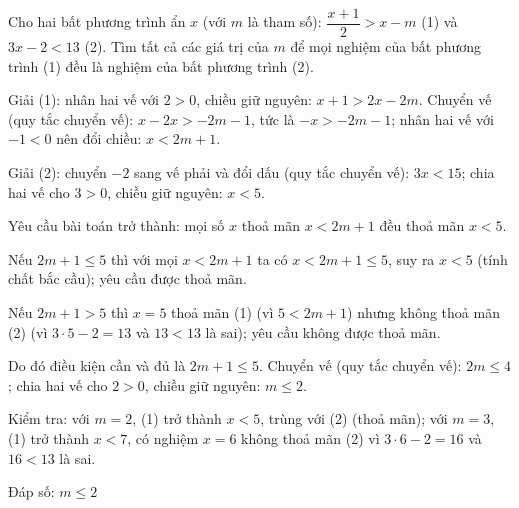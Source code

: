 \begin{problem}[9DS-BPT-030]
Cho hai bất phương trình ẩn $x$ (với $m$ là tham số): $\dfrac{x + 1}{2} > x - m$ (1) và $3x - 2 < 13$ (2). Tìm tất cả các giá trị của $m$ để mọi nghiệm của bất phương trình (1) đều là nghiệm của bất phương trình (2).

\begin{solution}
Giải (1): nhân hai vế với $2 > 0$, chiều giữ nguyên: $x + 1 > 2x - 2m$. Chuyển vế (quy tắc chuyển vế): $x - 2x > -2m - 1$, tức là $-x > -2m - 1$; nhân hai vế với $-1 < 0$ nên đổi chiều: $x < 2m + 1$.

Giải (2): chuyển $-2$ sang vế phải và đổi dấu (quy tắc chuyển vế): $3x < 15$; chia hai vế cho $3 > 0$, chiều giữ nguyên: $x < 5$.

Yêu cầu bài toán trở thành: mọi số $x$ thoả mãn $x < 2m + 1$ đều thoả mãn $x < 5$.

Nếu $2m + 1 \leq 5$ thì với mọi $x < 2m + 1$ ta có $x < 2m + 1 \leq 5$, suy ra $x < 5$ (tính chất bắc cầu); yêu cầu được thoả mãn.

Nếu $2m + 1 > 5$ thì $x = 5$ thoả mãn (1) (vì $5 < 2m + 1$) nhưng không thoả mãn (2) (vì $3 \cdot 5 - 2 = 13$ và $13 < 13$ là sai); yêu cầu không được thoả mãn.

Do đó điều kiện cần và đủ là $2m + 1 \leq 5$. Chuyển vế (quy tắc chuyển vế): $2m \leq 4$; chia hai vế cho $2 > 0$, chiều giữ nguyên: $m \leq 2$.

Kiểm tra: với $m = 2$, (1) trở thành $x < 5$, trùng với (2) (thoả mãn); với $m = 3$, (1) trở thành $x < 7$, có nghiệm $x = 6$ không thoả mãn (2) vì $3 \cdot 6 - 2 = 16$ và $16 < 13$ là sai.

Đáp số: $\boxed{m \leq 2}$
\end{solution}
\end{problem}


